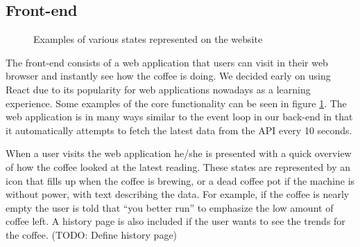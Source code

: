 \documentclass[12pt,a4paper,oneside,article]{memoir}
\numberwithin{equation}{chapter}
\begin{document}
\subsection{Front-end}\label{sec:front-end}
\begin{figure}[ht]
  \centerfloat{}
  \caption{Examples of various states represented on the website}\label{fig:website}
\end{figure}
The front-end consists of a web application that users can visit in their web 
browser and instantly see how the coffee is doing. We decided early on using 
React due to its popularity for web applications nowadays as a learning 
experience. Some examples of the core functionality can be seen in figure 
\ref{fig:website}. The web application is in many ways similar to the event 
loop in our back-end in that it automatically attempts to fetch the latest data 
from the API every 10 seconds.

When a user visits the web application he/she is presented with a quick
overview of how the coffee looked at the latest reading. These states are
represented by an icon that fills up when the coffee is brewing, or a dead
coffee pot if the machine is without power, with text describing the data. 
For example, if the coffee is nearly empty the user is told that ``you better 
run'' to emphasize the low amount of coffee left. A history page is also 
included if the user wants to see the trends for the coffee. (TODO: Define 
history page)
\end{document}
